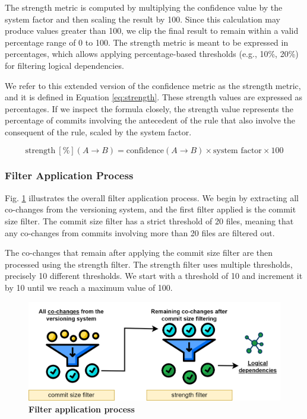 \documentclass{ieeeaccess}
\begin{document}
The strength metric is computed by multiplying the confidence value by the system factor and then scaling the result by 100. Since this calculation may produce values greater than 100, we clip the final result to remain within a valid percentage range of 0 to 100. The strength metric is meant to be expressed in percentages, which allows applying percentage-based thresholds (e.g., 10\%, 20\%) for filtering logical dependencies.

We refer to this extended version of the confidence metric as the strength metric, and it is defined in Equation \eqref{eq:strength}. These strength values are expressed as percentages. If we inspect the formula closely, the strength value represents the percentage of commits involving the antecedent of the rule that also involve the consequent of the rule, scaled by the system factor.

{\small
\begin{equation}
\text{strength}~[\%](A \rightarrow B) = \text{confidence}(A \rightarrow B) \times \text{system factor} \times 100
\label{eq:strength}
\end{equation}
}



\subsubsection{Filter Application Process}

Fig. \ref{fig:filtering} illustrates the overall filter application process. We begin by extracting all co-changes from the versioning system, and the first filter applied is the commit size filter. The commit size filter has a strict threshold of 20 files, meaning that any co-changes from commits involving more than 20 files are filtered out.

The co-changes that remain after applying the commit size filter are then processed using the strength filter. The strength filter uses multiple thresholds, precisely 10 different thresholds. We start with a threshold of 10 and increment it by 10 until we reach a maximum value of 100.

\begin{figure}[t!]
  \centering
  \includegraphics[width=\columnwidth]{filtering.png}
  \caption{ \textbf{Filter application process}}
  \label{fig:filtering}
\end{figure}
\end{document}
